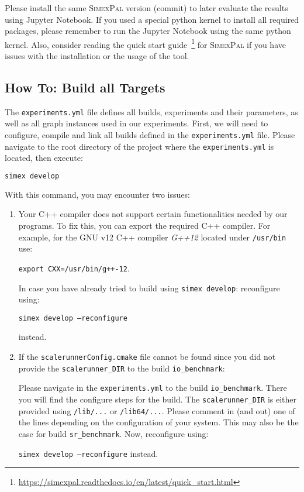 \documentclass[11pt, a4paper]{scrartcl}
\newcommand{\expfile}{\texttt{experiments.yml} file\xspace}
\newcommand{\simex}{\textsc{Simex\-Pal}\xspace}
\begin{document}
Please install the same \simex version (commit) to later evaluate the results
using Jupyter Notebook. If you used a special python kernel to install all
required packages, please remember to run the Jupyter Notebook using the same
python kernel. Also, consider reading the quick start
guide~\footnote{\url{https://simexpal.readthedocs.io/en/latest/quick_start.html}}
for \simex if you have issues with the installation or the usage of the tool.

\subsection{How To: Build all Targets}

The \texttt{experiments.yml} file defines all builds, experiments and their
parameters, as well as all graph instances used in our experiments. First, we
will need to configure, compile and link all builds defined in the \expfile.
Please navigate to the root directory of the project where the
\texttt{experiments.yml} is located, then execute:

\begin{lstlisting}[language=bash]
simex develop
\end{lstlisting}

With this command, you may encounter two issues:

\begin{enumerate}
    \item Your C++ compiler does not support certain functionalities needed by
    our programs. To fix this, you can export the required C++ compiler. For
    example, for the GNU v12 C++ compiler \textit{G++12} located under
    \texttt{/usr/bin} use:
    
    \texttt{export CXX=/usr/bin/g++-12}.
    
    In case you have already tried to build using \texttt{simex develop}:
    reconfigure using:
    
    \texttt{simex develop --reconfigure}
    
    instead.
    
    \item If the \texttt{scalerunnerConfig.cmake} file cannot be found since you
    did not provide the \texttt{scalerunner\_DIR} to the build
    \texttt{io\_benchmark}:
    
    Please navigate in the \texttt{experiments.yml} to the build
    \texttt{io\_benchmark}. There you will find the configure steps for the
    build. The \texttt{scalerunner\_DIR} is either provided using
    \texttt{/lib/...} or \texttt{/lib64/...}. Please comment in (and out) one
    of the lines depending on the configuration of your system. This may also
    be the case for build \texttt{sr\_benchmark}. Now, reconfigure using:
    
       
       \texttt{simex develop --reconfigure} instead.
\end{enumerate}
\end{document}
